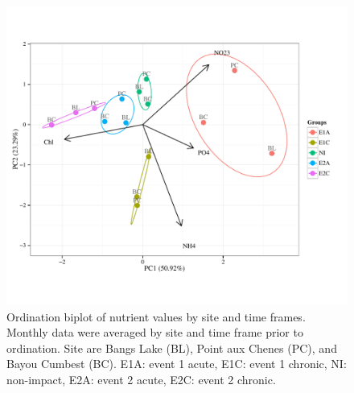 \documentclass[letterpaper,12pt]{article}\usepackage[]{graphicx}\usepackage[]{color}
\makeatletter
\def\maxwidth{ %
  \ifdim\Gin@nat@width>\linewidth
    \linewidth
  \else
    \Gin@nat@width
  \fi
}
\makeatother
\begin{document}
\clearpage

\begin{figure}[!ht]

{\centering \includegraphics[width=\maxwidth]{figs/pcafig-1} 

}

\caption[Ordination biplot of nutrient values by site and time frames]{Ordination biplot of nutrient values by site and time frames. Monthly data were averaged by site and time frame prior to ordination.  Site are Bangs Lake (BL), Point aux Chenes (PC), and Bayou Cumbest (BC). E1A: event 1 acute, E1C: event 1 chronic, NI: non-impact, E2A: event 2 acute, E2C: event 2 chronic.}\label{fig:pcafig}
\end{figure}


\clearpage
\end{document}
